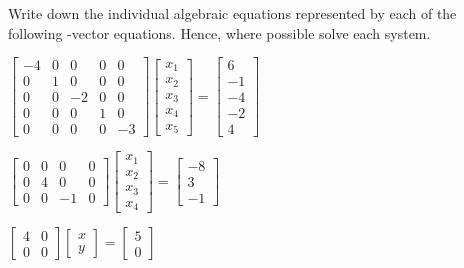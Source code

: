 \begin{exercise}  
Write down the individual algebraic equations represented by each of the following -vector equations.
Hence, where possible solve each system.
\begin{Parts}
\item \(\begin{bmatrix} -4&0&0&0&0
\\0&1&0&0&0
\\0&0&-2&0&0
\\0&0&0&1&0
\\0&0&0&0&-3 \end{bmatrix}
\begin{bmatrix}x_1\\x_2\\x_3\\x_4\\x_5\end{bmatrix}
=\begin{bmatrix} 6
\\-1
\\-4
\\-2
\\4 \end{bmatrix}\)

\item \(\begin{bmatrix} 0&0&0&0
\\0&4&0&0
\\0&0&-1&0 \end{bmatrix}
\begin{bmatrix}x_1\\x_2\\x_3\\x_4\end{bmatrix}
=\begin{bmatrix} -8
\\3
\\-1 \end{bmatrix}\)

\begin{OmitV1}
\item \(\begin{bmatrix} 4&0
\\0&0 \end{bmatrix}
\begin{bmatrix}x\\y\end{bmatrix}
=\begin{bmatrix} 5
\\0 \end{bmatrix}\)


\end{OmitV1}
\end{Parts}
\end{exercise}

